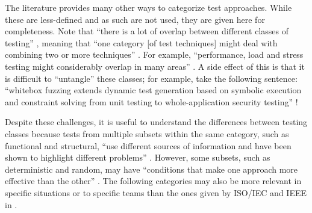 \begin{bigLandscape}
    \ieeeTestTermsTable{}
    \newpage
    \otherTestTermsTable{}
\end{bigLandscape}

The literature provides many other ways to categorize test approaches. While
these are less-defined and as such are not used, they are given here for
completeness. Note that ``there is a lot of overlap between different classes
of testing'' \citep[p.~8]{Firesmith2015}, meaning that ``one category [of test
        techniques] might deal with combining two or more techniques''
\citep[p.~5-10]{SWEBOK2024}. For example, ``performance, load and stress
testing might considerably overlap in many areas'' \citep[p.~1187]{Moghadam2019}.
A side effect of this is that it is difficult to ``untangle'' these classes;
for example, take the following sentence: ``whitebox fuzzing extends dynamic
test generation based on symbolic execution and constraint solving from unit
testing to whole-application security testing''
\citep[p.~23]{GodefroidAndLuchaup2011}!

Despite these challenges, it is useful to understand the differences between
testing classes because tests from multiple subsets within the same category,
such as functional and structural, ``use different sources of information and
have been shown to highlight different problems'' \citep[p.~5-16]{SWEBOK2024}.
However, some subsets, such as deterministic and random, may have ``conditions
that make one approach more effective than the other''
\citep[p.~5-16]{SWEBOK2024}. The following categories may also be more relevant
in specific situations or to specific teams than the ones given by ISO/IEC and
IEEE in .

